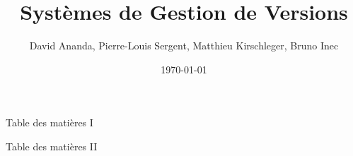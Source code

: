 \documentclass{beamer}
\title{Systèmes de Gestion de Versions}
\date{\today}
\author{David Ananda, Pierre-Louis Sergent, Matthieu Kirschleger, Bruno Inec}
\institute{IUT informatique Lyon1}
\begin{document}
  \maketitle

  \begin{frame}{Table des matières I}
    \tableofcontents[sections={1}]
      \framebreak
    \tableofcontents[sections={2}]
  \end{frame}
  \begin{frame}{Table des matières II}
    \tableofcontents[sections={3}]
  \end{frame}

  
  
  
\end{document}
